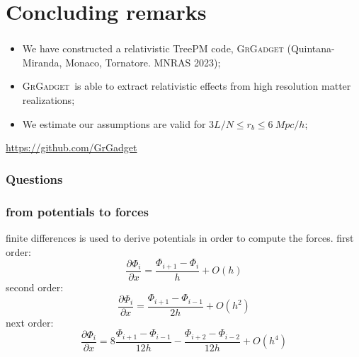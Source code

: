 \documentclass{beamer}
\makeatletter
\newcommand{\mylabel}{%
}
\newcommand{\grgadget}{\textsc{GrGadget}}
\newcommand{\Hconf}{\mathcal{H}}
\makeatother
\begin{document}
\section{Concluding remarks}
\frame{\sectionpage}

\begin{frame}[label=conclusions]
    \frametitle{\insertsection\mylabel}
    \begin{itemize}
    	\item We have constructed a relativistic TreePM code, \grgadget
	(Quintana-Miranda, Monaco, Tornatore. MNRAS 2023);
	\item \grgadget\ is able to extract relativistic effects from high
	resolution matter realizations;
	\item We estimate our assumptions are valid for
	$3L/N \le r_b \le \SI{6}{Mpc}/h$;
    \end{itemize}
    \begin{block}{}
	    \url{https://github.com/GrGadget}
    \end{block}
\end{frame}


\begin{frame}[label=questions]
    \frametitle{Questions}
\end{frame}

\begin{frame}[label=forcesnpotentials]
    \frametitle{from potentials to forces\mylabel}
    finite differences is used to derive potentials in order to compute the
    forces.
    first order:
    \[
        \frac{\partial \Phi_i}{\partial x} = \frac{ \Phi_{i+1} - \Phi_i }{h} + O(h)
    \]
    second order:
    \[
        \frac{\partial \Phi_i}{\partial x} =
         \frac{ \Phi_{i+1} - \Phi_{i-1} }{2h} + O(h^2)
    \]
    next order:
    \[
        \frac{\partial \Phi_i}{\partial x} =
        8\frac{ \Phi_{i+1} - \Phi_{i-1} }{12h} 
            - \frac{ \Phi_{i+2} - \Phi_{i-2} }{12h} + O(h^4)
    \]
\end{frame}
\end{document}
